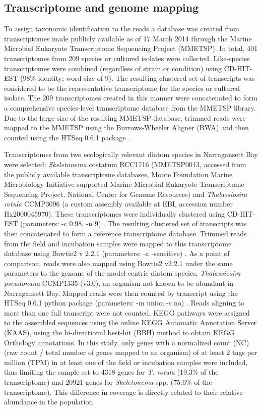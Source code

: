 \subsection{Transcriptome and genome mapping}
To assign taxonomic identification to the reads a database was created from transcriptomes made publicly available as of 17 March 2014 through the Marine Microbial Eukaryote Transcriptome Sequencing Project (MMETSP). In total, 401 transcriptomes from 209 species or cultured isolates were collected. Like-species transcriptomes were combined (regardless of strain or condition) using CD-HIT-EST (98\% identity; word size of 9). The resulting clustered set of transcripts was considered to be the representative transcriptome for the species or cultured isolate. The 209 transcriptomes created in this manner were concatenated to form a comprehensive species-level transcriptome database from the MMETSP library. Due to the large size of the resulting MMETSP database, trimmed reads were mapped to the MMETSP using the Burrows-Wheeler Aligner (BWA) \citep{Li2010} and then counted using the HTSeq 0.6.1 package \citep{Anders2014}.\par 
Transcriptomes from two ecologically relevant diatom species in Narragansett Bay were selected: \textit{Skeletonema} costatum RCC1716 (MMETSP0013, accessed from the publicly available transcriptome databases, Moore Foundation Marine Microbiology Initiative-supported Marine Microbial Eukaryote Transcriptome Sequencing Project, National Center for Genome Resources) and \textit{Thalassiosira rotula} CCMP3096 (a custom assembly available at EBI, accession number Hx2000045970). These transcriptomes were individually clustered using CD-HIT-EST (parameters: -c 0.98, -n 9) \citep{Li2006}. The resulting clustered set of transcripts was then concatenated to form a reference transcriptome database. Trimmed reads from the field and incubation samples were mapped to this transcriptome database using Bowtie2 v 2.2.1 (parameters: -a -sensitive) \citep{Langmead2012}. As a point of comparison, reads were also mapped using Bowtie2 v2.2.1 under the same parameters to the genome of the model centric diatom species, \textit{Thalassiosira pseudonana} CCMP1335 (v3.0), an organism not known to be abundant in Narragansett Bay. Mapped reads were then counted by transcript using the HTSeq 0.6.1 python package (parameters: -m union -s no) \citep{Anders2014}. Reads aligning to more than one full transcript were not counted. KEGG pathways were assigned to the assembled sequences using the online KEGG Automatic Annotation Server (KAAS), using the bi-directional best-hit (BBH) method to obtain KEGG Orthology annotations. In this study, only genes with a normalized count (NC) (raw count / total number of genes mapped to an organism) of at least 2 tags per million (TPM) in at least one of the field or incubation samples were included, thus limiting the sample set to 4318 genes for \textit{T. rotula} (19.3\% of the transcriptome) and 20921 genes for \textit{Skeletonema} spp. (75.6\% of the transcriptome). This difference in coverage is directly related to their relative abundance in the population.
